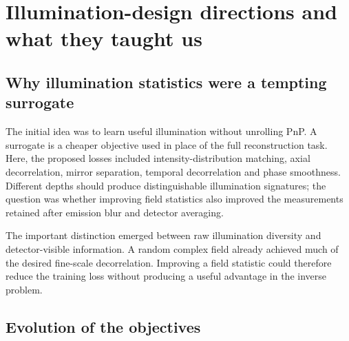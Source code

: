 \section{Illumination-design directions and what they taught us}

\subsection{Why illumination statistics were a tempting surrogate}

The initial idea was to learn useful illumination without unrolling PnP. A surrogate is a cheaper objective used in place of the full reconstruction task. Here, the proposed losses included intensity-distribution matching, axial decorrelation, mirror separation, temporal decorrelation and phase smoothness. Different depths should produce distinguishable illumination signatures; the question was whether improving field statistics also improved the measurements retained after emission blur and detector averaging.

The important distinction emerged between raw illumination diversity and detector-visible information. A random complex field already achieved much of the desired fine-scale decorrelation. Improving a field statistic could therefore reduce the training loss without producing a useful advantage in the inverse problem.

\subsection{Evolution of the objectives}

